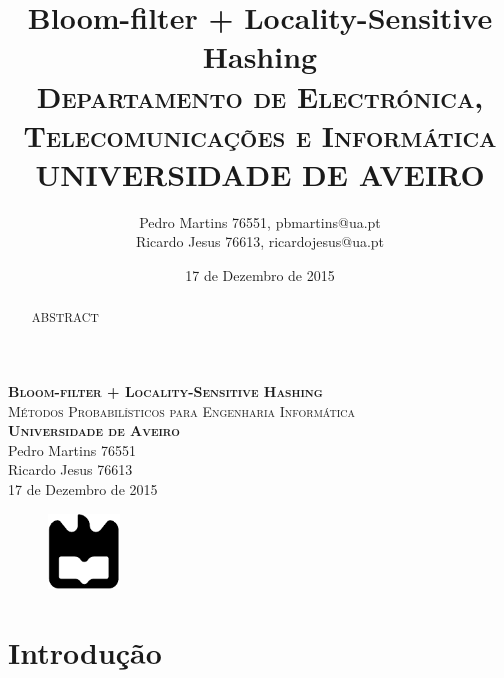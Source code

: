 \documentclass[a4paper,11pt,openright,oneside]{report}
\begin{document}
\begin{titlepage}
\begin{center}

{\vspace*{50mm}\textsc{\Huge\textbf{Bloom-filter + Locality-Sensitive Hashing}\\ \small{Métodos Probabilísticos para Engenharia Informática}}}\\[2cm]
{\textsc{\small\textbf{Universidade de Aveiro}}}\\[0.5cm]
{\small Pedro Martins 76551\\Ricardo Jesus 76613}\\[0.5cm]
{\small	17 de Dezembro de 2015}\\

\begin{figure}[b]
\center
\graphicspath{}
\includegraphics[height=2cm]{ua.pdf}
\end{figure}

\end{center}

\end{titlepage}

\title{\textbf{Bloom-filter + Locality-Sensitive Hashing}\\[1cm]\textsc{\small {Departamento de Electrónica, Telecomunicações e Informática} \\ \large {UNIVERSIDADE DE AVEIRO}}}
\author{Pedro Martins 76551, pbmartins@ua.pt\\Ricardo Jesus 76613, ricardojesus@ua.pt}
\date{17 de Dezembro de 2015}

\maketitle


\begin{abstract}

ABSTRACT

\end{abstract}

\tableofcontents
\listoffigures

\clearpage
{}

\chapter{Introdução}
\label{chap.introdução}
\end{document}
